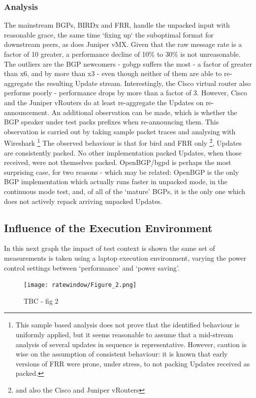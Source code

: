 \subsubsection*{Analysis}
The mainstream BGPs, BIRDx and FRR, handle the unpacked input with reasonable grace, the same time `fixing up` the suboptimal format for downstream peers, as does Juniper vMX.
Given that the raw message rate is a factor of 10 greater, a performance decline of 10\% to 30\% is not unreasonable.
The outliers are the BGP newcomers - gobgp suffers the most - a factor of greater than x6, and \hbgp by more than x3 - even though neither of them are able to re-aggregate the resulting Update stream.
Interestingly, the Cisco virtual router also performs poorly - performance drops by more than a factor of 3.
However, Cisco and the Juniper vRouters do at least re-aggregate the Updates on re-announcement.
An additional observation can be made, which is whether the BGP speaker under test packs prefixes when re-announcing them.
This observation is carried out by taking sample packet traces and analysing with Wireshark \footnote{This sample based analysis does not prove that the identified behaviour is uniformly applied, but it seems reasonable to assume that a mid-stream analysis of several updates in sequence is representative.
However, caution is wise on the assumption of consistent behaviour: it is known that early versions of FRR were prone, under stress, to not packing Updates received as packed.}
The observed behaviour is that for bird and FRR only \footnote{and also the Cisco and Juniper vRouters}, Updates are consistently packed.
No other implementation packed Updates, when those received, were not themselves packed.
OpenBGP/bgpd is perhaps the most surprising case, for two reasons - which may be related: OpenBGP is the only BGP implementation which actually runs faster in unpacked mode, in the continuous mode test, and, of all of the `mature'  BGPs, it is the only one which does not actively repack arriving unpacked Updates.

\subsection{Influence of the Execution Environment}
In this next graph the impact of test context is shown \- the same set of measurements is taken using a laptop execution environment, varying the power control settings between ‘performance’ and ‘power saving’.

\begin{figure}[H]
    \centering
    \texttt{[image: ratewindow/Figure\_2.png]}
    \caption{TBC - fig 2}
    \label{fig:rw_fig2}
\end{figure}

